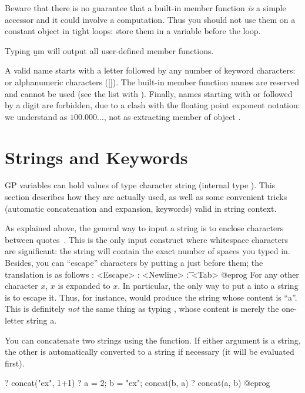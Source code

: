 Beware that there is no guarantee that a built-in member function \emph{is}
a simple accessor and it could involve a computation. Thus you should
not use them on a constant object in tight loops: store them in a variable
before the loop.

 Typing \b{um} will output all user-defined member functions.

 A valid name starts with a letter followed
by any number of keyword characters: \kbd{\_} or alphanumeric characters
([]). The built-in member function names are reserved and
cannot be used (see the list with ). Finally, names starting with
 or  followed by a digit are forbidden, due to a clash with
the floating point exponent notation: we understand  as
$100.000\dots$, not as extracting member  of object .

\section{Strings and Keywords}
\label{se:strings}

 GP variables can hold values of type character string
(internal type ). This section describes how they are actually used,
as well as some convenient tricks (automatic concatenation and expansion,
keywords) valid in string context.

As explained above, the general way to input a string is to enclose
characters between quotes~. This is the only input construct where
whitespace characters are significant: the string will contain the exact
number of spaces you typed in. Besides, you can ``escape'' characters by
putting a \kbd{\bs} just before them; the translation is as follows
\bprog
   \e: <Escape>
   \n: <Newline>
   \t: <Tab>
@eprog
For any other character $x$, \b{$x$} is expanded to $x$. In particular, the
only way to put a  into a string is to escape it. Thus, for
instance,  would produce the string whose content is
``a''. This is definitely \emph{not} the same thing as typing ,
whose content is merely the one-letter string a.

You can concatenate two strings using the  function. If either
argument is a string, the other is automatically converted to a string if
necessary (it will be evaluated first).

\bprog
? concat("ex", 1+1)
? a = 2; b = "ex"; concat(b, a)
? concat(a, b)
@eprog

